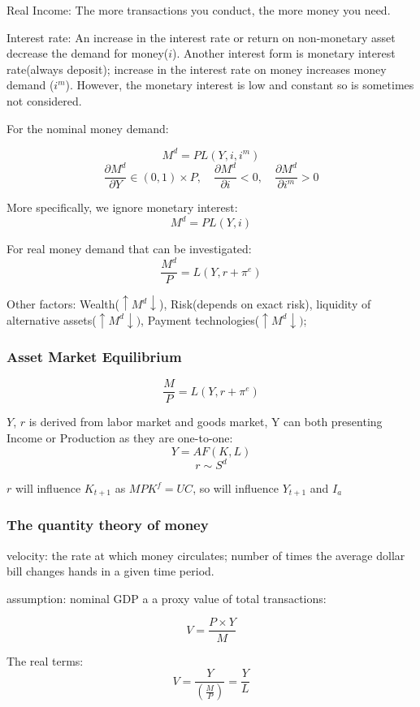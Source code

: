 \documentclass[10pt, a4paper]{article}
\begin{document}
        Real Income: The more transactions you conduct, the more money you need.

        Interest rate: An increase in the interest rate or return on non-monetary asset decrease the demand for money($i$). Another interest form is monetary interest rate(always deposit); increase in the interest rate on money increases money demand ($i^m$). However, the monetary interest is low and constant so is sometimes not considered. 

        For the nominal money demand: 
        
        $$M^d = PL(Y, i, i^m)$$ 
        $$\frac{\partial M^d}{\partial Y} \in (0, 1) \times P, \quad\frac{\partial M^d}{\partial i} < 0, \quad\frac{\partial M^d}{\partial i^m} > 0$$

        More specifically, we ignore monetary interest:
        $$M^d = PL(Y, i)$$

        For real money demand that can be investigated: 
        $$\frac{M^d}{P} = L(Y, r + \pi^e)$$
        
        Other factors: Wealth($\uparrow M^d\downarrow$), Risk(depends on exact risk), liquidity of alternative assets($\uparrow M^d\downarrow)$, Payment technologies($\uparrow M^d\downarrow)$;
    
    \subsubsection{Asset Market  Equilibrium} 
        $$\frac{M}{P} = L(Y, r + \pi^e)$$
        
        $Y$, $r$ is derived from labor market and goods market, Y can both presenting Income or Production as they are one-to-one: 
        $$Y = AF(K, L)$$
        $$r \sim S^d$$

        $r$ will influence $K_{t+1}$ as $MPK^f = UC$, so will influence $Y_{t+1}$ and $I_a$
    \subsubsection{The quantity theory of money}
        velocity: the rate at which money circulates; number of times the average dollar bill changes hands in a given time period. 
        
        assumption: nominal GDP a a proxy value of total transactions: 

        $$V = \frac{P \times Y}{M}$$

        The real terms: 
        $$V = \frac{Y}{(\frac{M}{P})} = \frac{Y}{L}$$
        
\end{document}
